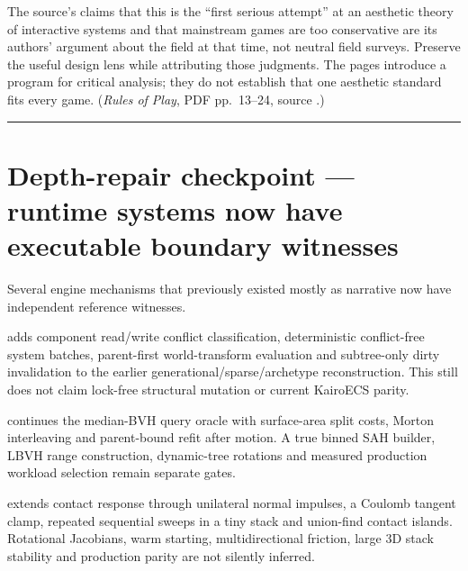 The source's claims that this is the ``first serious attempt'' at an aesthetic theory of interactive systems and that mainstream games are too conservative are its authors' argument about the field at that time, not neutral field surveys. Preserve the useful design lens while attributing those judgments. The pages introduce a program for critical analysis; they do not establish that one aesthetic standard fits every game. (\emph{Rules of Play}, PDF pp.~13--24, source .)

\begin{center}\rule{0.5\linewidth}{0.5pt}\end{center}

\section{Depth-repair checkpoint --- runtime systems now have executable boundary witnesses}\label{06-engine-ii-ch047-depth-repair-checkpoint-runtime-systems-now-have-executable-boundary-witnesses}

\hypertarget{06-engine-ii-ch047-depth-repair-checkpoint-runtime-systems-now-have-executable-boundary-witnesses}{}

Several engine mechanisms that previously existed mostly as narrative now have independent reference witnesses.

 adds component read/write conflict classification, deterministic conflict-free system batches, parent-first world-transform evaluation and subtree-only dirty invalidation to the earlier generational/sparse/archetype reconstruction. This still does not claim lock-free structural mutation or current KairoECS parity.

 continues the median-BVH query oracle with surface-area split costs, Morton interleaving and parent-bound refit after motion. A true binned SAH builder, LBVH range construction, dynamic-tree rotations and measured production workload selection remain separate gates.

 extends contact response through unilateral normal impulses, a Coulomb tangent clamp, repeated sequential sweeps in a tiny stack and union-find contact islands. Rotational Jacobians, warm starting, multidirectional friction, large 3D stack stability and production parity are not silently inferred.

